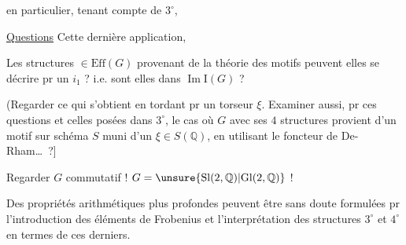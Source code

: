 en particulier, tenant compte de $3^\circ$,

\uline{Questions} Cette dernière application, 

Les structures $\in\mathrm{Eff}(G)$ provenant de la théorie des motifs peuvent elles  se décrire pr un $i_1$ ? i.e. sont elles dans $\operatorname{Im}\mathrm{I}(G)$ ?


(Regarder ce qui s'obtient en tordant pr un torseur $\xi$. Examiner aussi, pr ces questions et celles posées dans $3^\circ$, le cas où $G$ avec ses $4$ structures provient d'un motif sur schéma  $S$ muni d'un $\xi\in S(\mathbb{Q})$, en utilisant le foncteur de De-Rham\ldots\ ?]

Regarder $G$ commutatif ! $G=\unsure{\mathrm{Sl}(2,\mathbb{Q})|\mathrm{Gl}(2,\mathbb{Q})}$ !

Des propriétés arithmétiques plus profondes peuvent être sans doute formulées pr l'introduction des éléments de Frobenius et l'interprétation des structures $3^\circ$ et $4^\circ$ en termes de ces derniers.

